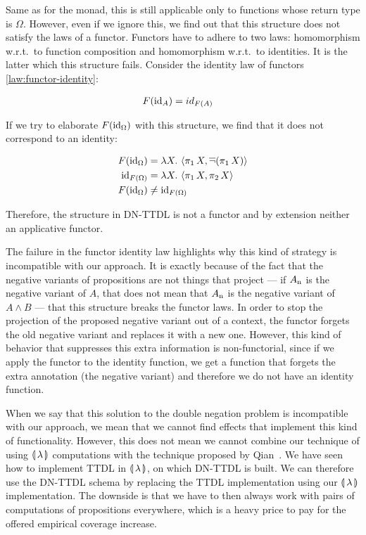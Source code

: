 Same as for the monad, this is still applicable only to functions whose
return type is $\Omega$. However, even if we ignore this, we find out that
this structure does not satisfy the laws of a functor. Functors have to
adhere to two laws: homomorphism w.r.t.\ to function composition and
homomorphism w.r.t.\ to identities. It is the latter which this structure
fails. Consider the identity law of functors \eqref{law:functor-identity}:

\begin{align*}
  F(\mathrm{id}_A) &= id_{F(A)}
\end{align*}

If we try to elaborate $F(\mathrm{id}_\Omega)$ with this structure, we find that it
does not correspond to an identity:

\begin{align*}
  F(\mathrm{id}_\Omega) &= \lambda X.\, \left< \pi_1\,X, \mathop{\overline{\lnot}}(\pi_1\,X) \right> \\
  \mathrm{id}_{F(\Omega)} &= \lambda X.\, \left< \pi_1\,X, \pi_2\,X \right> \\
  F(\mathrm{id}_\Omega) &\neq \mathrm{id}_{F(\Omega)}
\end{align*}

Therefore, the structure in DN-TTDL is not a functor and by extension
neither an applicative functor.

The failure in the functor identity law highlights why this kind of
strategy is incompatible with our approach. It is exactly because of the
fact that the negative variants of propositions are not things that project
--- if $A_{\mathrm{n}}$ is the negative variant of $A$, that does not mean that
$A_{\mathrm{n}}$ is the negative variant of $A \land B$ --- that this structure
breaks the functor laws. In order to stop the projection of the proposed
negative variant out of a context, the functor forgets the old negative
variant and replaces it with a new one. However, this kind of behavior that
suppresses this extra information is non-functorial, since if we apply the
functor to the identity function, we get a function that forgets the extra
annotation (the negative variant) and therefore we do not have an identity
function.

When we say that this solution to the double negation problem is
incompatible with our approach, we mean that we cannot find effects that
implement this kind of functionality. However, this does not mean we cannot
combine our technique of using $\llparenthesis \, \lambda \, \rrparenthesis$ computations with the
technique proposed by Qian~\cite{qian2014accessibility}. We have seen how
to implement TTDL in $\llparenthesis \, \lambda \, \rrparenthesis$, on which DN-TTDL is built. We can
therefore use the DN-TTDL schema by replacing the TTDL implementation using
our $\llparenthesis \, \lambda \, \rrparenthesis$ implementation. The downside is that we have to then
always work with pairs of computations of propositions everywhere, which is
a heavy price to pay for the offered empirical coverage increase.


